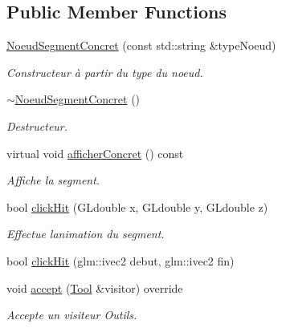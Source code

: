 \subsection*{Public Member Functions}
{\bf }\par
\begin{DoxyCompactItemize}
\item 
\hyperlink{class_noeud_segment_concret_a5fa9b4c7e916ecba1afdee2b92b782d0}{Noeud\+Segment\+Concret} (const std\+::string \&type\+Noeud)
\begin{DoxyCompactList}\small\item\em Constructeur à partir du type du noeud. \end{DoxyCompactList}\item 
\hyperlink{class_noeud_segment_concret_a1b6277e30f5a24954bd38c915914887d}{$\sim$\+Noeud\+Segment\+Concret} ()
\begin{DoxyCompactList}\small\item\em Destructeur. \end{DoxyCompactList}\item 
virtual void \hyperlink{class_noeud_segment_concret_a755c965f09fe2ca3d148812fda08b5d6}{afficher\+Concret} () const 
\begin{DoxyCompactList}\small\item\em Affiche la segment. \end{DoxyCompactList}\item 
bool \hyperlink{class_noeud_segment_concret_a5aa1e10fe850cab0bb32290f9f228e9b}{click\+Hit} (G\+Ldouble x, G\+Ldouble y, G\+Ldouble z)
\begin{DoxyCompactList}\small\item\em Effectue l\textquotesingle{}animation du segment. \end{DoxyCompactList}\item 
bool \hyperlink{class_noeud_segment_concret_a6a98a44348fcd5fcccad77ffa48efc52}{click\+Hit} (glm\+::ivec2 debut, glm\+::ivec2 fin)
\item 
\hypertarget{class_noeud_segment_concret_a89f6362356646f3cc7d564aba168712d}{}void \hyperlink{class_noeud_segment_concret_a89f6362356646f3cc7d564aba168712d}{accept} (\hyperlink{class_tool}{Tool} \&visitor) override\label{class_noeud_segment_concret_a89f6362356646f3cc7d564aba168712d}

\begin{DoxyCompactList}\small\item\em Accepte un visiteur Outils. \end{DoxyCompactList}\end{DoxyCompactItemize}

